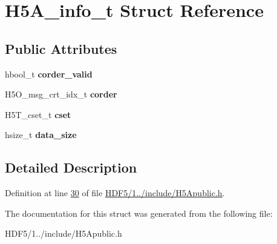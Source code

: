 \hypertarget{struct_h5_a__info__t}{}\section{H5\+A\+\_\+info\+\_\+t Struct Reference}
\label{struct_h5_a__info__t}
\subsection*{Public Attributes}
\begin{DoxyCompactItemize}
\item 
\mbox{\label{struct_h5_a__info__t_a451c1a971255b29b9739d5fe7ea5205c}} 
hbool\+\_\+t {\bfseries corder\+\_\+valid}
\item 
\mbox{\label{struct_h5_a__info__t_a9c3f9496faf9fad470d8b241054aaab7}} 
H5\+O\+\_\+msg\+\_\+crt\+\_\+idx\+\_\+t {\bfseries corder}
\item 
\mbox{\label{struct_h5_a__info__t_a28538eefef8dea2dab7b53c621f606c6}} 
H5\+T\+\_\+cset\+\_\+t {\bfseries cset}
\item 
\mbox{\label{struct_h5_a__info__t_a9be3b26a2d4808b9376e92fd9ab4c9ca}} 
hsize\+\_\+t {\bfseries data\+\_\+size}
\end{DoxyCompactItemize}


\subsection{Detailed Description}


Definition at line \hyperlink{_h_d_f5_21_810_81_2include_2_h5_apublic_8h_source_l00030}{30} of file \hyperlink{_h_d_f5_21_810_81_2include_2_h5_apublic_8h_source}{H\+D\+F5/1../include/\+H5\+Apublic.\+h}.



The documentation for this struct was generated from the following file\+:\begin{DoxyCompactItemize}
\item 
H\+D\+F5/1../include/\+H5\+Apublic.\+h\end{DoxyCompactItemize}
